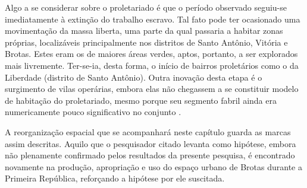 \begin{citacao}
Algo a se considerar sobre o proletariado é que o período observado seguiu-se imediatamente à extinção do trabalho escravo. Tal fato pode ter ocasionado uma movimentação da massa liberta, uma parte da qual passaria a habitar zonas próprias, localizáveis principalmente nos distritos de Santo Antônio, Vitória e Brotas. Estes eram os de maiores áreas verdes, aptos, portanto, a ser explorados mais livremente. Ter-se-ia, desta forma, o início de bairros proletários como o da Liberdade (distrito de Santo Antônio). Outra inovação desta etapa é o surgimento de vilas operárias, embora elas não chegassem a se constituir modelo de habitação do proletariado, mesmo porque seu segmento fabril ainda era numericamente pouco significativo no conjunto \cite[pp.~21-22]{santos_habitacao_1990}.
\end{citacao}

A reorganização espacial que se acompanhará neste capítulo guarda as marcas assim descritas. Aquilo que o pesquisador citado levanta como hipótese, embora não plenamente confirmado pelos resultados da presente pesquisa, é encontrado novamente na produção, apropriação e uso do espaço urbano de Brotas durante a Primeira República, reforçando a hipótese por ele suscitada.



